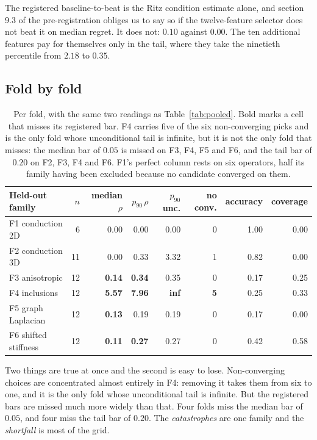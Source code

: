 \documentclass[11pt]{article}
\begin{document}
The registered baseline-to-beat is the Ritz condition estimate alone, and section
9.3 of the pre-registration obliges us to say so if the twelve-feature selector
does not beat it on median regret. It does not: $0.10$ against $0.00$. The ten
additional features pay for themselves only in the tail, where they take the
ninetieth percentile from $2.18$ to $0.35$.

\subsection{Fold by fold}

\begin{table}[h]
\centering
\begin{tabular}{lrrrrrrr}
\toprule
Held-out family & $n$ & median $\rho$ & $p_{90}\,\rho$ & $p_{90}$ unc. & no conv. & accuracy & coverage \\
\midrule
F1 conduction 2D   & 6  & 0.00 & 0.00 & 0.00 & 0 & 1.00 & 0.00 \\
F2 conduction 3D   & 11 & 0.00 & 0.33 & 3.32 & 1 & 0.82 & 0.00 \\
F3 anisotropic     & 12 & \textbf{0.14} & \textbf{0.34} & 0.35 & 0 & 0.17 & 0.25 \\
F4 inclusions      & 12 & \textbf{5.57} & \textbf{7.96} & \textbf{inf} & \textbf{5} & 0.25 & 0.33 \\
F5 graph Laplacian & 12 & \textbf{0.13} & 0.19 & 0.19 & 0 & 0.17 & 0.00 \\
F6 shifted stiffness & 12 & \textbf{0.11} & \textbf{0.27} & 0.27 & 0 & 0.42 & 0.58 \\
\bottomrule
\end{tabular}
\caption{Per fold, with the same two readings as Table~\ref{tab:pooled}. Bold marks a
cell that misses its registered bar. F4 carries five of the six non-converging picks and
is the only fold whose unconditional tail is infinite, but it is not the only fold that
misses: the median bar of $0.05$ is missed on F3, F4, F5 and F6, and the tail bar of
$0.20$ on F2, F3, F4 and F6. F1's perfect column rests on six operators, half its family
having been excluded because no candidate converged on them.}
\label{tab:folds}
\end{table}

Two things are true at once and the second is easy to lose. Non-converging choices are
concentrated almost entirely in F4: removing it takes them from six to one, and it is the
only fold whose unconditional tail is infinite. But the registered bars are missed much
more widely than that. Four folds miss the median bar of $0.05$, and four miss the tail
bar of $0.20$. The \emph{catastrophes} are one family and the \emph{shortfall} is most
of the grid.
\end{document}
